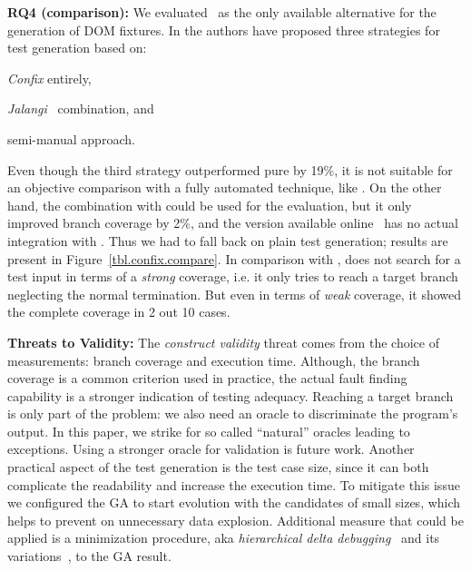 \textbf{RQ4 (comparison):} We evaluated \Confix\ as the only available alternative for the generation of DOM fixtures. In \cite{amin:ase15} the authors have proposed three strategies for test generation based on:
\begin{enumerate*}[label=(\roman*)]
  \item \emph{Confix} entirely,
  \item \emph{Jalangi}~\cite{sen2013jalangi} combination, and
  \item semi-manual approach.
\end{enumerate*}
Even though the third strategy outperformed pure \Confix by 19\%, it is not suitable for an objective comparison with a fully automated technique, like \Jedi. On the other hand, the combination with \Jalangi could be used for the evaluation, but it only improved branch coverage by 2\%, and the \Confix version available online~\cite{confixgit} has no actual integration with \Jalangi. Thus we had to fall back on plain \Confix test generation; results are present in Figure~\ref{tbl.confix.compare}. In comparison with \Jedi, \Confix does not search for a test input in terms of a \emph{strong} coverage, i.e. it only tries to reach a target branch neglecting the normal termination. But even in terms of \emph{weak} coverage, it showed the complete coverage in 2 out 10 cases.\\

\textbf{Threats to Validity:}
The \emph{construct validity} threat comes from the choice of measurements: branch coverage and execution time. Although, the branch coverage is a common criterion used in practice, the actual fault finding capability is a stronger indication of testing adequacy. Reaching a target branch is only part of the problem: we also need an oracle to discriminate the program's output. In this paper, we strike for so called ``natural'' oracles leading to exceptions. Using a stronger oracle for validation is future work. Another practical aspect of the test generation is the test case size, since it can both complicate the readability and increase the execution time. To mitigate this issue we configured the GA to start evolution with the candidates of small sizes, which helps to prevent on unnecessary data explosion. Additional measure that could be applied is a minimization procedure, aka \emph{hierarchical delta debugging}~\cite{misherghi2006hdd} and its variations~\cite{herfert2017automatically}, to the GA result.

